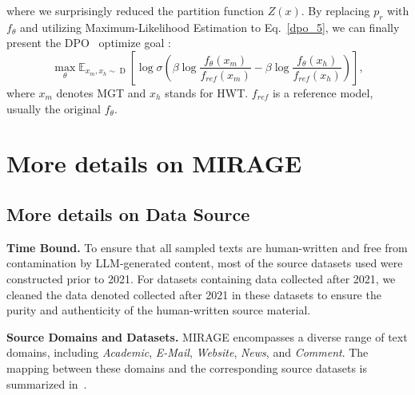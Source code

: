 \documentclass[sigconf, screen, review, anonymous]{acmart}
\begin{document}
where we surprisingly reduced the partition function $Z(x)$.
%
By replacing $p_r$ with $f_\theta$ and utilizing Maximum-Likelihood Estimation to Eq.~\eqref{dpo_5}, we can finally present the DPO~\cite{dpo} optimize goal :
\begin{equation}
    \mathop{max}_\theta \mathbb{E}_{x_m, x_h \sim \mathop{D}}[\log \sigma(\beta\log\frac{f_\theta(x_m)}{f_{ref}(x_m)}-\beta\log\frac{f_\theta(x_h)}{f_{ref}(x_h)})],
    \label{dpo_6}
\end{equation}
where $x_m$ denotes MGT and $x_h$ stands for HWT.
%
$f_{ref}$ is a reference model, usually the original $f_\theta$.

\section{More details on MIRAGE}
\subsection{More details on Data Source}
\noindent \textbf{Time Bound. }
To ensure that all sampled texts are human-written and free from contamination by LLM-generated content, most of the source datasets used were constructed prior to 2021.
%
For datasets containing data collected after 2021, we cleaned the data denoted collected after 2021 in these datasets to ensure the purity and authenticity of the human-written source material.

\noindent \textbf{Source Domains and Datasets. }
MIRAGE encompasses a diverse range of text domains, including \textit{Academic}, \textit{E-Mail}, \textit{Website}, \textit{News}, and \textit{Comment}.
%
The mapping between these domains and the corresponding source datasets is summarized in~.

\begin{table}[htbp]
    \centering
    \renewcommand{\arraystretch}{1.25}
    \caption{Source datasets for each domain. }
    \label{tab:source_datasets}
\end{table}
\end{document}
